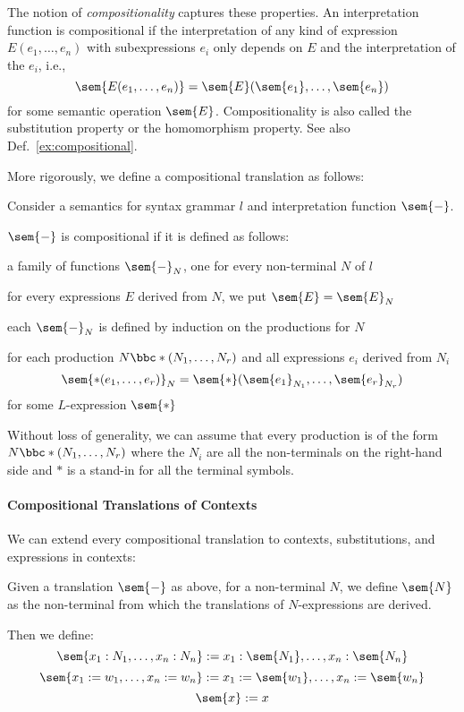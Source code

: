 The notion of \emph{compositionality} captures these properties.
An interpretation function is compositional if the interpretation of any kind of expression $E(e_1,\ldots,e_n)$ with subexpressions $e_i$ only depends on $E$ and the interpretation of the $e_i$, i.e., \[\sem{E(e_1,\ldots,e_n)}=\sem{E}(\sem{e_1},\ldots,\sem{e_n})\] for some semantic operation $\sem{E}$.
Compositionality is also called the substitution property or the homomorphism property.
See also Def.~\ref{ex:compositional}.

More rigorously, we define a compositional translation as follows:
\begin{definition}
Consider a semantics for syntax grammar $l$ and interpretation function $\sem{-}$.

$\sem{-}$ is compositional if it is defined as follows:
\begin{compactitem}
 \item a family of functions $\sem{-}_N$, one for every non-terminal $N$ of $l$
 \item for every expressions $E$ derived from $N$, we put $\sem{E}=\sem{E}_N$
 \item each $\sem{-}_N$ is defined by induction on the productions for $N$
 \item for each production $N\bbc *(N_1,\ldots,N_r)$ and all expressions $e_i$ derived from $N_i$
   \[\sem{*(e_1,\ldots,e_r)}_N=\sem{*}(\sem{e_1}_{N_1},\ldots,\sem{e_r}_{N_r})\]
   for some $L$-expression $\sem{*}$
\end{compactitem}

Without loss of generality, we can assume that every production is of the form $N\bbc *(N_1,\ldots,N_r)$ where the $N_i$ are all the non-terminals on the right-hand side and $*$ is a stand-in for all the terminal symbols.
\end{definition}

\paragraph{Compositional Translations of Contexts}
We can extend every compositional translation to contexts, substitutions, and expressions in contexts:

\begin{definition}
Given a translation $\sem{-}$ as above, for a non-terminal $N$, we define $\sem{N}$ as the non-terminal from which the translations of $N$-expressions are derived.

Then we define:
\[\sem{x_1:N_1,\ldots,x_n:N_n}:=x_1:\sem{N_1},\ldots,x_n:\sem{N_n}\]
\[\sem{x_1:=w_1,\ldots,x_n:=w_n}:=x_1:=\sem{w_1},\ldots,x_n:=\sem{w_n}\]
\[\sem{x}:=x\]
\end{definition}

